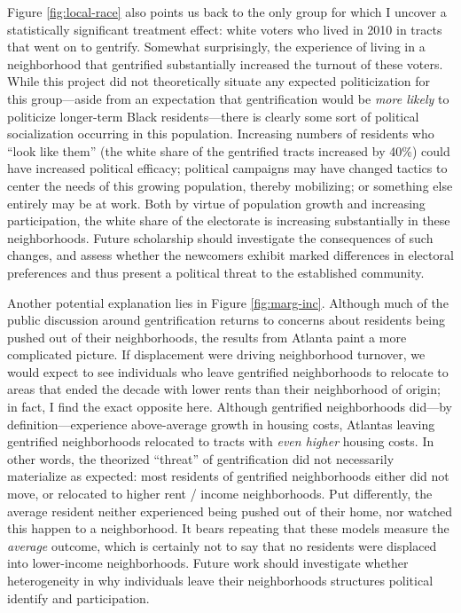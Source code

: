 \documentclass[
  12pt,
]{article}
\begin{document}
Figure \ref{fig:local-race} also points us back to the only group for which I uncover a statistically significant treatment effect: white voters who lived in 2010 in tracts that went on to gentrify. Somewhat surprisingly, the experience of living in a neighborhood that gentrified substantially increased the turnout of these voters. While this project did not theoretically situate any expected politicization for this group---aside from an expectation that gentrification would be \emph{more likely} to politicize longer-term Black residents---there is clearly some sort of political socialization occurring in this population. Increasing numbers of residents who ``look like them'' (the white share of the gentrified tracts increased by 40\%) could have increased political efficacy; political campaigns may have changed tactics to center the needs of this growing population, thereby mobilizing; or something else entirely may be at work. Both by virtue of population growth and increasing participation, the white share of the electorate is increasing substantially in these neighborhoods. Future scholarship should investigate the consequences of such changes, and assess whether the newcomers exhibit marked differences in electoral preferences and thus present a political threat to the established community.

Another potential explanation lies in Figure \ref{fig:marg-inc}. Although much of the public discussion around gentrification returns to concerns about residents being pushed out of their neighborhoods, the results from Atlanta paint a more complicated picture. If displacement were driving neighborhood turnover, we would expect to see individuals who leave gentrified neighborhoods to relocate to areas that ended the decade with lower rents than their neighborhood of origin; in fact, I find the exact opposite here. Although gentrified neighborhoods did---by definition---experience above-average growth in housing costs, Atlantas leaving gentrified neighborhoods relocated to tracts with \emph{even higher} housing costs. In other words, the theorized ``threat'' of gentrification did not necessarily materialize as expected: most residents of gentrified neighborhoods either did not move, or relocated to higher rent / income neighborhoods. Put differently, the average resident neither experienced being pushed out of their home, nor watched this happen to a neighborhood. It bears repeating that these models measure the \emph{average} outcome, which is certainly not to say that no residents were displaced into lower-income neighborhoods. Future work should investigate whether heterogeneity in why individuals leave their neighborhoods structures political identify and participation.
\end{document}

